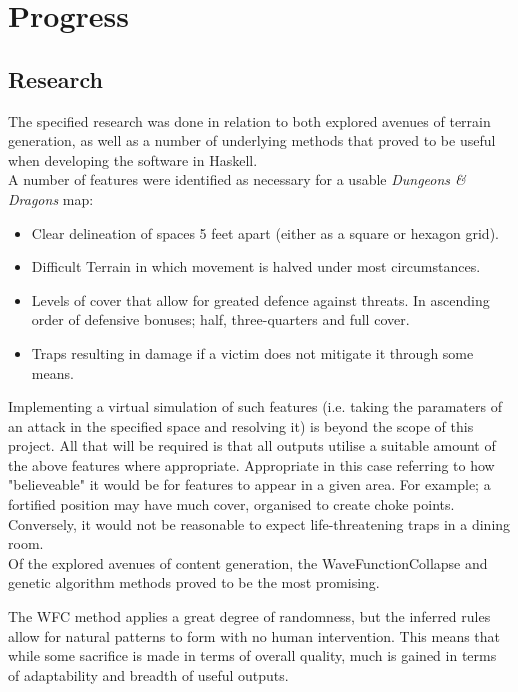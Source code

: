 \documentclass{article}
\begin{document}
\section{Progress}

\subsection{Research}
The specified research was done in relation to both explored avenues of terrain generation, as well as a number of underlying methods that proved to be useful when developing the software in Haskell.\\



A number of features were identified as necessary for a usable \textit{Dungeons \& Dragons} map:
\begin{itemize}
    \item Clear delineation of spaces 5 feet apart (either as a square or hexagon grid).
    \item Difficult Terrain in which movement is halved under most circumstances.
    \item Levels of cover that allow for greated defence against threats. In ascending order of defensive bonuses; half, three-quarters and full cover.
    \item Traps resulting in damage if a victim does not mitigate it through some means.
\end{itemize}
Implementing a virtual simulation of such features (i.e. taking the paramaters of an attack in the specified space and resolving it) is beyond the scope of this project. All that will be required is that all outputs utilise a suitable amount of the above features where appropriate. Appropriate in this case referring to how "believeable" it would be for features to appear in a given area. For example; a fortified position may have much cover, organised to create choke points. Conversely, it would not be reasonable to expect life-threatening traps in a dining room.\\



Of the explored avenues of content generation, the WaveFunctionCollapse and genetic algorithm methods proved to be the most promising. 



The WFC method applies a great degree of randomness, but the inferred rules allow for natural patterns to form with no human intervention. This means that while some sacrifice is made in terms of overall quality, much is gained in terms of adaptability and breadth of useful outputs. 
\end{document}
